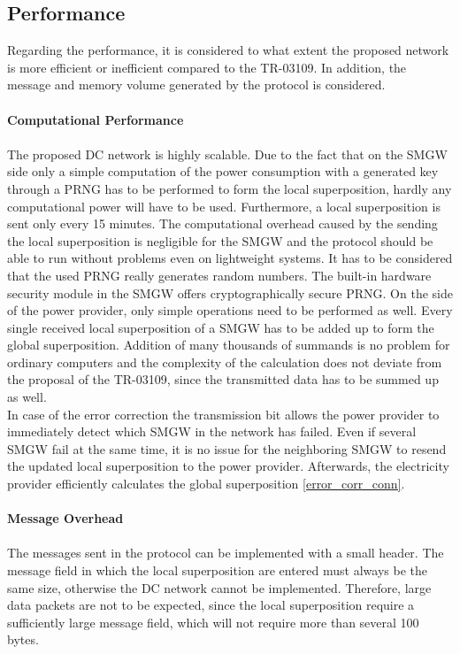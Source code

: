 \subsection{Performance}
\label{performance}
Regarding the performance, it is considered to what extent the proposed network is more efficient or inefficient compared to the \gls{TR-03109}. In addition, the message and memory volume generated by the protocol is considered.
\\
\\
\textbf{Computational Performance}
\\
\\
The proposed DC network is highly scalable. Due to the fact that on the \gls{SMGW} side only a simple computation of the power consumption with a generated key through a PRNG has to be performed to form the local superposition, hardly any computational power will have to be used. Furthermore, a local superposition is sent only every 15 minutes. The computational overhead caused by the sending the local superposition is negligible for the \gls{SMGW} and the protocol should be able to run without problems even on lightweight systems. It has to be considered that the used PRNG really generates random numbers. The built-in hardware security module in the \gls{SMGW} offers cryptographically secure PRNG. On the side of the power provider, only simple operations need to be performed as well. Every single received local superposition of a \gls{SMGW} has to be added up to form the global superposition. Addition of many thousands of summands is no problem for ordinary computers and the complexity of the calculation does not deviate from the proposal of the \gls{TR-03109}, since the transmitted data has to be summed up as well.\\
In case of the error correction the transmission bit allows the power provider to immediately detect which \gls{SMGW} in the network has failed. Even if several \gls{SMGW} fail at the same time, it is no issue for the neighboring \gls{SMGW} to resend the updated local superposition to the power provider. Afterwards, the electricity provider efficiently calculates the global superposition \ref{error_corr_conn}.\\
\\
\textbf{Message Overhead}
\\
\\
The messages sent in the protocol can be implemented with a small header. The message field in which the local superposition are entered must always be the same size, otherwise the DC network cannot be implemented. Therefore, large data packets are not to be expected, since the local superposition require a sufficiently large message field, which will not require more than several 100 bytes. \\

